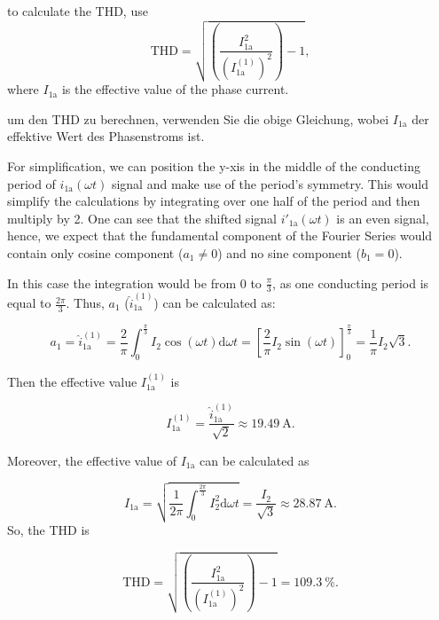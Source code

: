 \begin{hintblock}
    to calculate the THD, use $$ \mathrm{THD} = \sqrt{\left(\frac{I^2_\mathrm{1a}}{(I^\mathrm{(1)}_\mathrm{1a})^2}\right)-1},$$ where $I_\mathrm{1a}$
    is the effective value of the phase current. 
\end{hintblock}
\begin{germanhintblock}
    um den THD zu berechnen, verwenden Sie die obige Gleichung, wobei $I_\mathrm{1a}$ der effektive Wert des Phasenstroms ist.
\end{germanhintblock}
 
\begin{solutionblock}
 

    For simplification, we can position the y-xis in the middle of the conducting period of $i_\mathrm{1a}(\omega t)$ 
    signal and make use of the period's symmetry. This would simplify the calculations by integrating over one 
    half of the period and then multiply by 2. 
    One can see that the shifted signal $i'_{\mathrm{1a}}(\omega t)$ is an even signal, hence, we expect that the fundamental component of the Fourier 
    Series would contain only cosine component ($a_1 \neq 0$) and no sine component ($b_1 = 0$). 
        
     In this case the integration would be from 0 to $\frac{\pi}{3}$, as 
    one conducting period is equal to $\frac{2\pi}{3}$. Thus, $a_1$ ($\hat{i}^\mathrm{(1)}_\mathrm{1a}$) 
    can be calculated as:

        
    $$ a_1 = \hat{i}^\mathrm{(1)}_\mathrm{1a} = \frac{2}{\pi}\int_{0}^{\frac{\pi}{3}}I_\mathrm{2}\cos(\omega t) \mathrm{d}\omega t = \left[\frac{2}{\pi} I_\mathrm{2} \sin(\omega t)\right]^{\frac{\pi}{3}}_{0} = \frac{1}{\pi}I_\mathrm{2}\sqrt{3}.$$  
        
    Then the effective value $I^\mathrm{(1)}_\mathrm{1a}$ is
    
    $$ I^\mathrm{(1)}_\mathrm{1a} = \frac{\hat{i}^\mathrm{(1)}_\mathrm{1a}}{\sqrt{2}} \approx \SI{19.49}{\ampere}.$$
        
    Moreover, the effective value of $I_\mathrm{1a}$ can be calculated as 
    
    $$ I_\mathrm{1a} = \sqrt{\frac{1}{2\pi}\int_{0}^{\frac{2\pi}{3}} I^2_\mathrm{2}\mathrm{d}\omega t} =  \frac{I_\mathrm{2}}{\sqrt{3}} \approx \SI{28.87}{\ampere}.$$   
    So, the THD is
    
    $$ \mathrm{THD} = \sqrt{\left(\frac{I^2_\mathrm{1a}}{(I^\mathrm{(1)}_\mathrm{1a})^2}\right)-1} = \SI{109.3}{\percent}.$$ 
\end{solutionblock}
